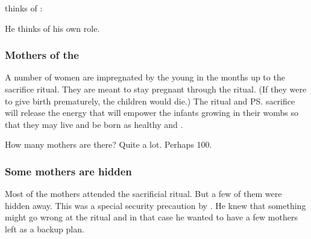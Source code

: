 \Thanatzil{} thinks of \Erebos: 


He thinks of his own role. 






\subsubsection{Mothers of the \resphan}
A number of \nephilic{} women are impregnated by the young \Thanatzil{} in the months up to the sacrifice ritual. 
They are meant to stay pregnant through the ritual. 
(If they were to give birth prematurely, the children would die.)
The ritual and \ps{\Thanatzil} sacrifice will release the \bane{} energy that will empower the infants growing in their wombs so that they may live and be born as healthy \resphain{} and \resviel. 

How many mothers are there? 
Quite a lot. 
Perhaps 100. 





\subsubsection{Some mothers are hidden}
Most of the mothers attended the sacrificial ritual. 
But a few of them were hidden away. 
This was a special security precaution by \Daggerrain. 
He knew that something might go wrong at the ritual and in that case he wanted to have a few mothers left as a backup plan. 

